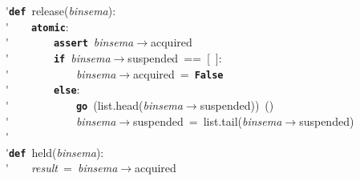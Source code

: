 \'\>\texttt{\textbf{def}}~release(\textit{binsema}):\\

\'\>~~~~\texttt{\textbf{atomic}}:\\

\'\>~~~~~~~~\texttt{\textbf{assert}}~\textit{binsema}$\rightarrow$acquired\\

\'\>~~~~~~~~\texttt{\textbf{if}}~\textit{binsema}$\rightarrow$suspended~==~[~]:\\

\'\>~~~~~~~~~~~~\textit{binsema}$\rightarrow$acquired~=~\texttt{\textbf{False}}\\

\'\>~~~~~~~~\texttt{\textbf{else}}:\\

\'\>~~~~~~~~~~~~\texttt{\textbf{go}}~(list.head(\textit{binsema}$\rightarrow$suspended))~()\\

\'\>~~~~~~~~~~~~\textit{binsema}$\rightarrow$suspended~=~list.tail(\textit{binsema}$\rightarrow$suspended)\\

\'\>\\

\'\>\texttt{\textbf{def}}~held(\textit{binsema}):\\

\'\>~~~~\textit{result}~=~\textit{binsema}$\rightarrow$acquired